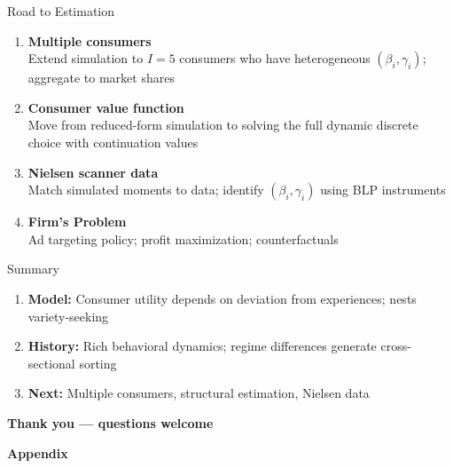 \documentclass[aspectratio=169,professionalfonts]{beamer}
\newcommand{\hl}[1]{\textbf{\textcolor{UGARed}{#1}}}
\begin{document}
\begin{frame}{Road to Estimation}
  \begin{enumerate}
    \item \hl{Multiple consumers} \\
          Extend simulation to $I = 5$ consumers who have heterogeneous $(\beta_i, \gamma_i)$;
          aggregate to market shares

    \vspace{4pt}
    \item \hl{Consumer value function} \\
          Move from reduced-form simulation to solving the full
          dynamic discrete choice with continuation values

    \vspace{4pt}
    \item \hl{Nielsen scanner data} \\
          Match simulated moments to data;
          identify $(\beta_i, \gamma_i)$ using BLP instruments

    \vspace{4pt}
    \item \hl{Firm's Problem} \\
          Ad targeting policy; profit maximization; counterfactuals
  \end{enumerate}
\end{frame}


\begin{frame}{Summary}
  \begin{enumerate}
    \item \hl{Model:} Consumer utility depends on deviation from
          experiences; nests variety-seeking 

    \vspace{4pt}
    \item \hl{History:} Rich behavioral dynamics; regime differences
          generate cross-sectional sorting

    \vspace{4pt}
    \item \hl{Next:} Multiple consumers, structural estimation,
          Nielsen data
  \end{enumerate}

  \vspace{10pt}
  \centering
  \Large\textbf{Thank you --- questions welcome}
\end{frame}

\appendix
\begin{frame}
  \centering
  \vspace{2cm}
  {\Large \textbf{Appendix}}
\end{frame}
\end{document}
